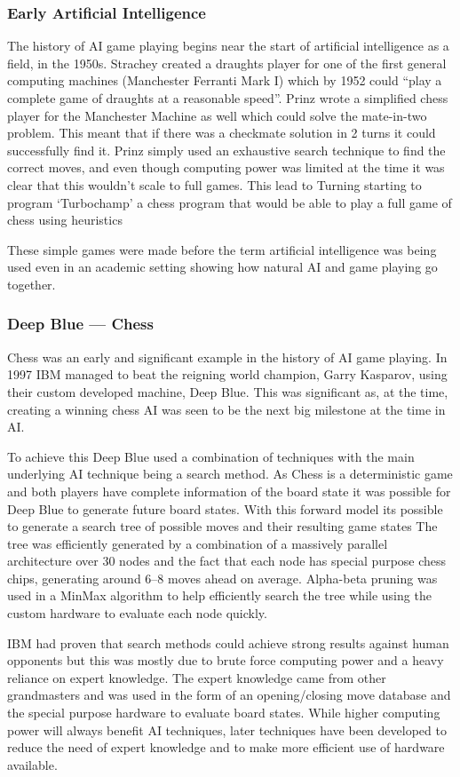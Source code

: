 \documentclass[a4paper]{article}
\begin{document}
\subsubsection{Early Artificial Intelligence}
The history of AI game playing begins near the start of artificial intelligence as a field, in the 1950s.
Strachey created a draughts player for one of the first general computing machines (Manchester Ferranti Mark I) which by  1952 could ``play a complete game of draughts at a reasonable speed''\cite{BreifHistoryComputing}.
Prinz wrote a simplified chess player for the Manchester Machine as well which could solve the mate-in-two problem.
This meant that if there was a checkmate solution in 2 turns it could successfully find it\cite{BreifHistoryComputing}.
Prinz simply used an exhaustive search technique to find the correct moves, and even though computing power was limited at the time it was clear that this wouldn't scale to full games.
This lead to Turning starting to program `Turbochamp' a chess program that would be able to play a full game of chess using heuristics\cite{BreifHistoryComputing}
\par
These simple games were made before the term artificial intelligence was being used even in an academic setting showing how natural AI and game playing go together.

\subsubsection{Deep Blue --- Chess}
Chess was an early and significant example in the history of AI game playing.
In 1997 IBM managed to beat the reigning world champion, Garry Kasparov, using their custom developed machine, Deep Blue\cite{deepBlue}.
This was significant as, at the time, creating a winning chess AI was seen to be the next big milestone at the time in AI\@.
\par
To achieve this Deep Blue used a combination of techniques with the main underlying AI technique being a search method.
As Chess is a deterministic game and both players have complete information of the board state it was possible for Deep Blue to generate future board states.
With this forward model its possible to generate a search tree of possible moves and their resulting game states
The tree was efficiently generated by a combination of a massively parallel architecture over 30 nodes and the fact that each node has special purpose chess chips, generating around 6--8 moves ahead on average.
Alpha-beta pruning was used in a MinMax algorithm to help efficiently search the tree while using the custom hardware to evaluate each node quickly.
\par
IBM had proven that search methods could achieve strong results against human opponents but this was mostly due to brute force computing power and a heavy reliance on expert knowledge.
The expert knowledge came from other grandmasters and was used in the form of an opening/closing move database and the special purpose hardware to evaluate board states.
While higher computing power will always benefit AI techniques, later techniques have been developed to reduce the need of expert knowledge and to make more efficient use of hardware available.
\end{document}
